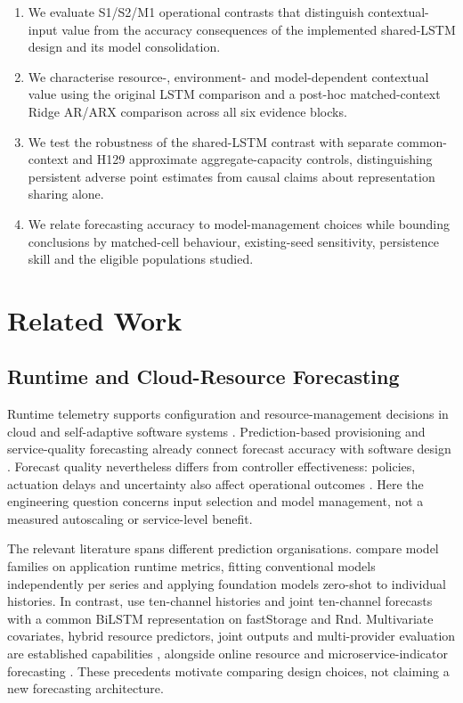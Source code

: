 \documentclass[a4paper,fleqn]{cas-dc}
\begin{document}
\begin{enumerate}
  \item We evaluate S1/S2/M1 operational contrasts that distinguish
    contextual-input value from the accuracy consequences of the implemented
    shared-LSTM design and its model consolidation.
  \item We characterise resource-, environment- and model-dependent contextual
    value using the original LSTM comparison and a post-hoc matched-context
    Ridge AR/ARX comparison across all six evidence blocks.
  \item We test the robustness of the shared-LSTM contrast with separate
    common-context and H129 approximate aggregate-capacity controls,
    distinguishing persistent adverse point estimates from causal claims
    about representation sharing alone.
  \item We relate forecasting accuracy to model-management choices while
    bounding conclusions by matched-cell behaviour, existing-seed sensitivity,
    persistence skill and the eligible populations studied.
\end{enumerate}

\section{Related Work}
\label{sec:related-work}

\subsection{Runtime and Cloud-Resource Forecasting}
\label{sec:rw-runtime}

Runtime telemetry supports configuration and resource-management decisions in
cloud and self-adaptive software systems
\citep{Taherizadeh2018Monitoring,Bauer2020SelfAware}. Prediction-based
provisioning and service-quality forecasting already connect forecast accuracy
with software design
\citep{Calheiros2015ARIMA,Syu2017DynamicQoS}. Forecast quality nevertheless
differs from controller effectiveness: policies, actuation delays and
uncertainty also affect operational outcomes \citep{Qu2018Autoscaling}.
Here the engineering question concerns input selection and model management,
not a measured autoscaling or service-level benefit.

The relevant literature spans different prediction organisations.
\citet{DiMenna2026RuntimeForecasting} compare model families on application
runtime metrics, fitting conventional models independently per series and
applying foundation models zero-shot to individual histories. In contrast,
\citet{Ullah2023CloudBiLSTM} use ten-channel histories and joint ten-channel
forecasts with a common BiLSTM representation on fastStorage and Rnd.
Multivariate covariates, hybrid resource predictors, joint outputs and
multi-provider evaluation are established capabilities
\citep{Tran2018MultivariateFuzzy,Xu2022esDNN,Tripathi2025MMRP,
Rossi2025CloudUncertainty,Zhang2025SWTCLSTM}, alongside online resource and
microservice-indicator forecasting \citep{Gao2026OMCR,Gao2026MaMiClif}.
These precedents motivate comparing design choices, not claiming a new
forecasting architecture.
\end{document}
